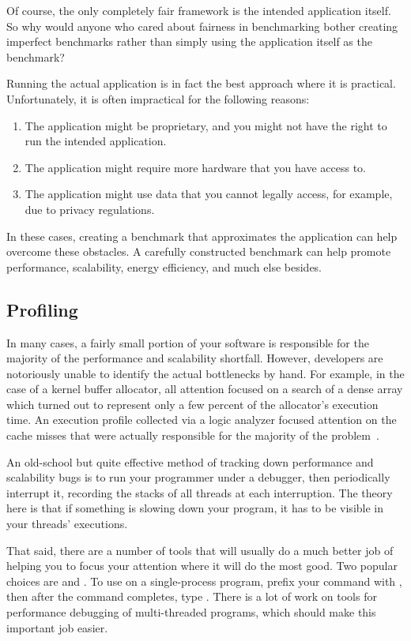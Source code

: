 Of course,  the only completely fair framework is the intended
application itself.
So why would anyone who cared about fairness in benchmarking
bother creating imperfect benchmarks rather than simply
using the application itself as the benchmark?

Running the actual application is in fact the best approach where it is practical.
Unfortunately, it is often impractical for the following reasons:

\begin{enumerate}
\item	The application might be proprietary, and you
	might not have the right to run the intended application.
\item	The application might require more hardware
	that you have access to.
\item	The application might use data that you cannot legally
	access, for example, due to privacy regulations.
\end{enumerate}

In these cases, creating a benchmark that approximates
the application can help overcome these obstacles.
A carefully constructed benchmark can help promote performance,
scalability, energy efficiency, and much else besides.

\subsection{Profiling}
\label{sec:debugging:Profiling}

In many cases, a fairly small portion of your software is responsible
for the majority of the performance and scalability shortfall.
However, developers are notoriously unable to identify the actual
bottlenecks by hand.
For example, in the case of a kernel buffer allocator, all attention focused
on a search of a dense array which turned out to represent only
a few percent of the allocator's execution time.
An execution profile collected via a logic analyzer focused attention
on the cache misses that were actually responsible for the majority
of the problem~\cite{McKenney93}.

An old-school but quite effective method of tracking down performance
and scalability bugs is to run your programmer under a debugger,
then periodically interrupt it, recording the stacks of all threads
at each interruption.
The theory here is that if something is slowing down your program,
it has to be visible in your threads' executions.

That said, there are a number of tools
that will usually do a much better job of helping you to focus your
attention where it will do the most good.
Two popular choices are  and .
To use  on a single-process program, prefix your command
with , then after the command completes, type
.
There is a lot of work on tools for performance debugging of multi-threaded
programs, which should make this important job easier.

